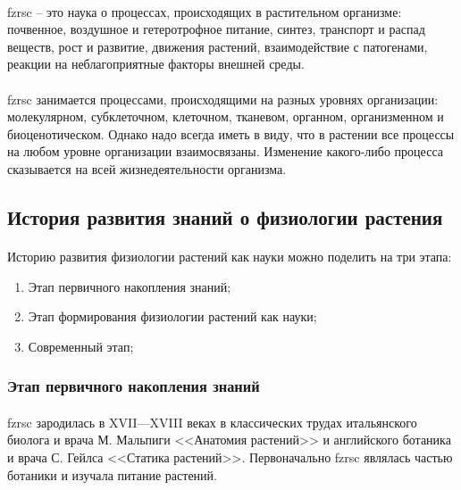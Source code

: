\paragraph*{}

\paragraph*{}\gls{fzrsc} -- это наука о процессах, происходящих в растительном организме: почвенное, воздушное и гетеротрофное питание, синтез, транспорт и распад веществ, рост и развитие, движения растений, взаимодействие с патогенами, реакции на неблагоприятные факторы внешней среды. 


\paragraph*{}\gls{fzrsc} занимается процессами, происходящими на разных уровнях организации: молекулярном, субклеточном, клеточном, тканевом, органном, организменном и биоценотическом. Однако надо всегда иметь в виду, что в растении все процессы на любом уровне организации взаимосвязаны. Изменение какого-либо процесса сказывается на всей жизнедеятельности организма.

\subsection*{История развития знаний о физиологии растения}

\paragraph*{}Историю развития физиологии растений как науки можно поделить на три этапа:

\begin{enumerate}
\item Этап первичного накопления знаний;
\item Этап формирования физиологии растений как науки;
\item Современный этап;
\end{enumerate}

\subsubsection*{Этап первичного накопления знаний}

\paragraph*{}\gls{fzrsc} зародилась в XVII—XVIII веках в классических трудах итальянского биолога и врача М. Мальпиги <<Анатомия растений>> и английского ботаника и врача С. Гейлса <<Статика растений>>. Первоначально \gls{fzrsc} являлась частью ботаники и изучала питание растений.

